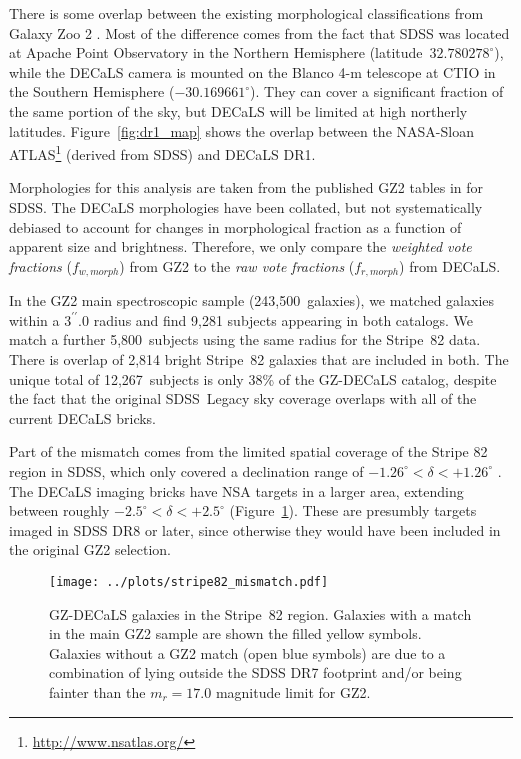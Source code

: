 \documentclass[iop,apj,tighten]{emulateapj}
\begin{document}
There is some overlap between the existing morphological classifications from Galaxy Zoo 2 \citep{wil13}. Most of the difference comes from the fact that SDSS was located at Apache Point Observatory in the Northern Hemisphere (latitude~$32.780278^\circ$), while the DECaLS camera is mounted on the Blanco 4-m telescope at CTIO in the Southern Hemisphere ($-30.169661^\circ$). They can cover a significant fraction of the same portion of the sky, but DECaLS will be limited at high northerly latitudes. Figure~\ref{fig:dr1_map} shows the overlap between the NASA-Sloan ATLAS\footnote{\url{http://www.nsatlas.org/}} (derived from SDSS) and DECaLS DR1. 

Morphologies for this analysis are taken from the published GZ2 tables in \citet{wil13} for SDSS. The DECaLS morphologies have been collated, but not systematically debiased to account for changes in morphological fraction as a function of apparent size and brightness. Therefore, we only compare the \emph{weighted vote fractions} ($f_{w,morph}$) from GZ2 to the \emph{raw vote fractions} ($f_{r,morph}$) from DECaLS.

In the GZ2 main spectroscopic sample (243,500~galaxies), we matched galaxies within a $3^{\prime\prime}.0$ radius and find 9,281 subjects appearing in both catalogs. We match a further 5,800~subjects using the same radius for the Stripe~82 data. There is overlap of 2,814 bright Stripe~82 galaxies that are included in both. The unique total of 12,267~subjects is only 38\% of the GZ-DECaLS catalog, despite the fact that the original SDSS~Legacy sky coverage \citep{str02} overlaps with all of the current DECaLS bricks. 

Part of the mismatch comes from the limited spatial coverage of the Stripe 82 region in SDSS, which only covered a declination range of $-1.26^\circ<\delta<+1.26^\circ$ \citep{ann14}. The DECaLS imaging bricks have NSA targets in a larger area, extending between roughly $-2.5^\circ<\delta<+2.5^\circ$ (Figure~\ref{fig:mismatch_map}). These are presumbly targets imaged in SDSS DR8 or later, since otherwise they would have been included in the original GZ2 selection. 

\begin{figure}
\centering
\texttt{[image: ../plots/stripe82\_mismatch.pdf]}
\caption{GZ-DECaLS galaxies in the Stripe~82 region. Galaxies with a match in the main GZ2 sample are shown the filled yellow symbols. Galaxies without a GZ2 match (open blue symbols) are due to a combination of lying outside the SDSS DR7 footprint and/or being fainter than the $m_r=17.0$ magnitude limit for GZ2.\label{fig:mismatch_map}}
\end{figure}
\end{document}
